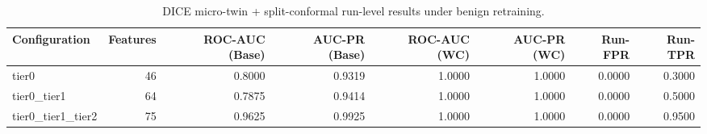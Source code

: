 \begin{table}[t]
\centering
\caption{DICE micro-twin + split-conformal run-level results under benign retraining.}
\label{tab:dice_full_overall}
\footnotesize
\begin{tabular}{lrrrrrrr}
\toprule
Configuration & Features & ROC-AUC (Base) & AUC-PR (Base) & ROC-AUC (WC) & AUC-PR (WC) & Run-FPR & Run-TPR \\
\midrule
tier0 & 46 & 0.8000 & 0.9319 & 1.0000 & 1.0000 & 0.0000 & 0.3000 \\
tier0_tier1 & 64 & 0.7875 & 0.9414 & 1.0000 & 1.0000 & 0.0000 & 0.5000 \\
tier0_tier1_tier2 & 75 & 0.9625 & 0.9925 & 1.0000 & 1.0000 & 0.0000 & 0.9500 \\
\bottomrule
\end{tabular}

\end{table}
